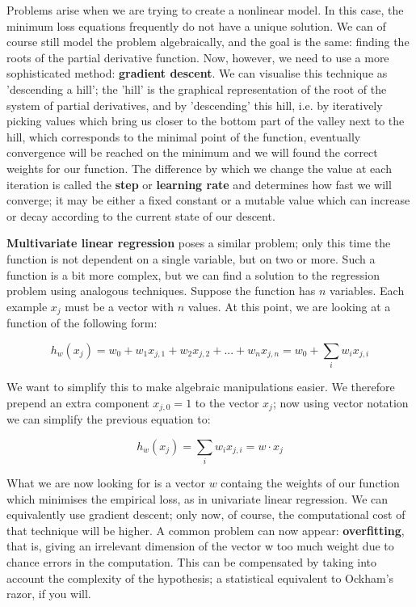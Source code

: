 \begin{itemize}
{    Problems arise when we are trying to create a nonlinear model. In
    this case, the minimum loss equations frequently do not have a unique
    solution. We can of course still model the problem algebraically, and
    the goal is the same: finding the roots of the partial derivative
    function. Now, however, we need to use a more sophisticated method:
    \textbf{gradient descent}. We can visualise this technique as
    'descending a hill'; the 'hill' is the graphical representation of the
    root of the system of partial derivatives, and by 'descending' this
    hill, i.e. by iteratively picking values which bring us closer to the
    bottom part of the valley next to the hill, which corresponds to the
    minimal point of the function, eventually convergence will be reached
    on the minimum and we will found the correct weights for our
    function. The difference by which we change the value at each
    iteration is called the \textbf{step} or \textbf{learning rate} and
    determines how fast we will converge; it may be either a fixed
    constant or a mutable value which can increase or decay according to
    the current state of our descent.

    \textbf{Multivariate linear regression} poses a similar problem;
    only this time the function is not dependent on a single variable, but
    on two or more. Such a function is a bit more complex, but we can
    find a solution to the regression problem using analogous
    techniques. Suppose the function has $n$ variables. Each example $x_j$
    must be a vector with $n$ values. At this point, we are looking at a
    function of the following form:
    
    \begin{equation}
      h_w(x_j) = w_0 + w_1x_{j,1} + w_2x_{j,2} + ... + w_nx_{j,n} = w_0 + \sum\limits_{i} w_ix_{j,i}
    \end{equation}

    We want to simplify this to make algebraic manipulations
    easier. We therefore prepend an extra component $x_{j,0} = 1$ to the
    vector $x_j$; now using vector notation we can simplify the
    previous equation to:

    \begin{equation}
      h_w(x_j) = \sum\limits_{i} w_ix_{j,i} = w \cdot x_j
    \end{equation}

    What we are now looking for is a vector $w$ containg the weights
    of our function which minimises the empirical loss, as in
    univariate linear regression. We can equivalently use gradient
    descent; only now, of course, the computational cost of that technique
    will be higher. A common problem can now appear: \textbf{overfitting},
    that is, giving an irrelevant dimension of the vector w too much
    weight due to chance errors in the computation. This can be
    compensated by taking into account the complexity of the hypothesis; a
    statistical equivalent to Ockham's razor, if you will.
  }


\end{itemize}
